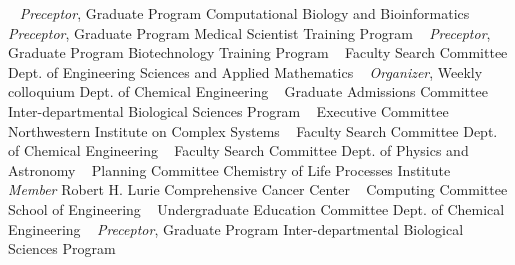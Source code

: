 ~
\Gap
{}
\textit{Preceptor}, Graduate Program\newline
Computational Biology and Bioinformatics \newline
~
\Gap
{}
\textit{Preceptor}, Graduate Program\newline
Medical Scientist Training Program \newline
~
\Gap
{}
\textit{Preceptor}, Graduate Program\newline
Biotechnology Training Program \newline
~
\Gap
{}
Faculty Search Committee\newline
Dept. of Engineering Sciences and Applied Mathematics  \newline
~
\Gap
{}
\textit{Organizer}, Weekly colloquium\newline
Dept. of Chemical Engineering \newline
~
\Gap
{}
Graduate Admissions Committee\newline
Inter-departmental Biological Sciences Program \newline
~
\Gap
{}
Executive Committee\newline
Northwestern Institute on Complex Systems \newline
~
\Gap
{}
Faculty Search Committee\newline
Dept. of Chemical Engineering \newline
~
\Gap
{}
Faculty Search Committee\newline
Dept. of Physics and Astronomy \newline
~
\Gap
{}
Planning Committee\newline
Chemistry of Life Processes Institute \newline
~
\Gap
{}
\textit{Member}
Robert H. Lurie Comprehensive Cancer Center \newline
~
\Gap
{}
Computing Committee\newline
School of Engineering \newline
~
\Gap
{}
Undergraduate Education Committee\newline
Dept. of Chemical Engineering \newline
~
\Gap
{}
\textit{Preceptor}, Graduate Program\newline
Inter-departmental Biological Sciences Program \newline
~
\Gap
\vspace*{0.2cm}